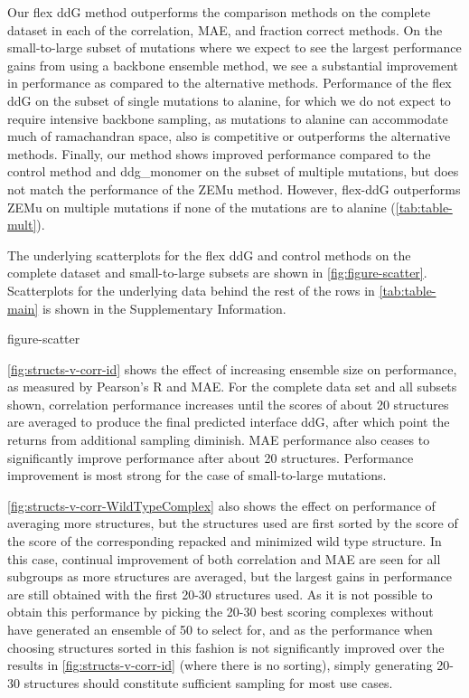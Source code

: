 Our flex ddG method outperforms the comparison methods on the complete dataset in each of the correlation, MAE, and fraction correct methods. On the small-to-large subset of mutations where we expect to see the largest performance gains from using a backbone ensemble method, we see a substantial improvement in performance as compared to the alternative methods. Performance of the flex ddG on the subset of single mutations to alanine, for which we do not expect to require intensive backbone sampling, as mutations to alanine can accommodate much of ramachandran space\cite{cunningham_high-resolution_1989}, also is competitive or outperforms the alternative methods. Finally, our method shows improved performance compared to the control method and ddg\_monomer on the subset of multiple mutations, but does not match the performance of the ZEMu method.
However, flex-ddG outperforms ZEMu on multiple mutations if none of the mutations are to alanine (\cref{tab:table-mult}).

The underlying scatterplots for the flex ddG and control methods on the complete dataset and small-to-large subsets are shown in \cref{fig:figure-scatter}. Scatterplots for the underlying data behind the rest of the rows in \cref{tab:table-main} is shown in the Supplementary Information.

{figure-scatter}

\cref{fig:structs-v-corr-id} shows the effect of increasing ensemble size on performance, as measured by Pearson’s R and MAE. For the complete data set and all subsets shown, correlation performance increases until the scores of about 20 structures are averaged to produce the final predicted interface ddG, after which point the returns from additional sampling diminish. MAE performance also ceases to significantly improve performance after about 20 structures. Performance improvement is most strong for the case of small-to-large mutations.

\cref{fig:structs-v-corr-WildTypeComplex} also shows the effect on performance of averaging more structures, but the structures used are first sorted by the score of the score of the corresponding repacked and minimized wild type structure. In this case, continual improvement of both correlation and MAE are seen for all subgroups as more structures are averaged, but the largest gains in performance are still obtained with the first 20-30 structures used. As it is not possible to obtain this performance by picking the 20-30 best scoring complexes without have generated an ensemble of 50 to select for, and as the performance when choosing structures sorted in this fashion is not significantly improved over the results in \cref{fig:structs-v-corr-id} (where there is no sorting), simply generating 20-30 structures should constitute sufficient sampling for most use cases.

